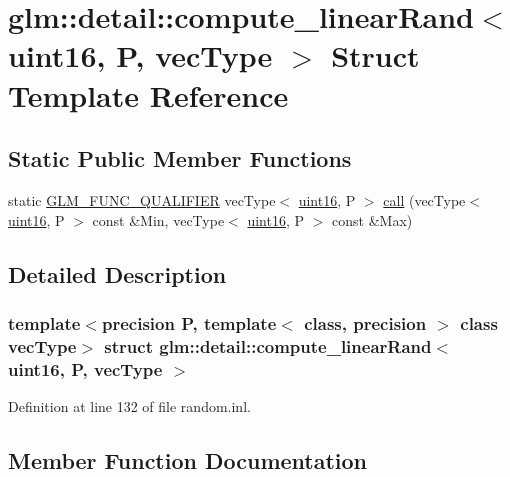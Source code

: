 \hypertarget{structglm_1_1detail_1_1compute__linear_rand_3_01uint16_00_01_p_00_01vec_type_01_4}{}\section{glm\+::detail\+::compute\+\_\+linear\+Rand$<$ uint16, P, vec\+Type $>$ Struct Template Reference}
\label{structglm_1_1detail_1_1compute__linear_rand_3_01uint16_00_01_p_00_01vec_type_01_4}
\subsection*{Static Public Member Functions}
\begin{DoxyCompactItemize}
\item 
static \mbox{\hyperlink{setup_8hpp_a33fdea6f91c5f834105f7415e2a64407}{G\+L\+M\+\_\+\+F\+U\+N\+C\+\_\+\+Q\+U\+A\+L\+I\+F\+I\+ER}} vec\+Type$<$ \mbox{\hyperlink{namespaceglm_1_1detail_a47b2a7d006d187338e8031a352d1ce56}{uint16}}, P $>$ \mbox{\hyperlink{structglm_1_1detail_1_1compute__linear_rand_3_01uint16_00_01_p_00_01vec_type_01_4_a3a569e5edff462a90e4c2deeeed6f4cf}{call}} (vec\+Type$<$ \mbox{\hyperlink{namespaceglm_1_1detail_a47b2a7d006d187338e8031a352d1ce56}{uint16}}, P $>$ const \&Min, vec\+Type$<$ \mbox{\hyperlink{namespaceglm_1_1detail_a47b2a7d006d187338e8031a352d1ce56}{uint16}}, P $>$ const \&Max)
\end{DoxyCompactItemize}


\subsection{Detailed Description}
\subsubsection*{template$<$precision P, template$<$ class, precision $>$ class vec\+Type$>$\newline
struct glm\+::detail\+::compute\+\_\+linear\+Rand$<$ uint16, P, vec\+Type $>$}



Definition at line 132 of file random.\+inl.



\subsection{Member Function Documentation}
\mbox{\label{structglm_1_1detail_1_1compute__linear_rand_3_01uint16_00_01_p_00_01vec_type_01_4_a3a569e5edff462a90e4c2deeeed6f4cf}} 
